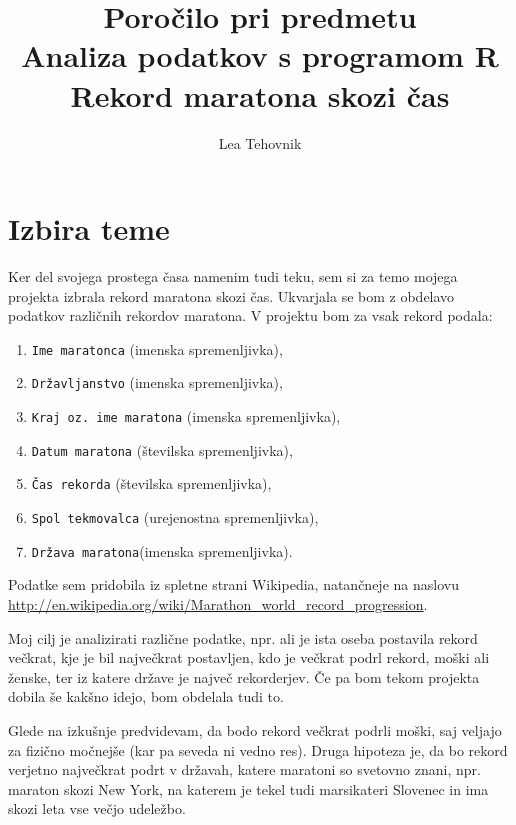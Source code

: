 \documentclass[11pt,a4paper]{article}
\begin{document}
\title{Poročilo pri predmetu \\
Analiza podatkov s programom R\\
\vspace{3mm}
\textbf{{Rekord maratona skozi čas}}}
\author{Lea Tehovnik}
\maketitle


\section{Izbira teme}

Ker del svojega prostega časa namenim tudi teku, sem si za temo mojega projekta izbrala rekord maratona skozi čas.  Ukvarjala se bom z obdelavo podatkov različnih rekordov maratona. V projektu bom za vsak rekord podala:
\begin{enumerate}
\item{\verb|Ime maratonca| (imenska spremenljivka),}
\item{\verb|Državljanstvo| (imenska spremenljivka),}
\item{\verb|Kraj oz. ime maratona| (imenska spremenljivka),}
\item{\verb|Datum maratona| (številska spremenljivka),}
\item{\verb|Čas rekorda| (številska spremenljivka),}
\item{\verb|Spol tekmovalca| (urejenostna spremenljivka),}
\item{\verb|Država maratona|(imenska spremenljivka).}
\end{enumerate}
 

Podatke sem pridobila iz spletne strani Wikipedia, natančneje na naslovu \url{http://en.wikipedia.org/wiki/Marathon_world_record_progression}.

Moj cilj je analizirati različne podatke, npr. ali je ista oseba postavila rekord večkrat, kje je bil največkrat postavljen, kdo je večkrat podrl rekord, moški ali ženske, ter iz katere države je največ rekorderjev. Če pa bom tekom projekta dobila še kakšno idejo, bom obdelala tudi to.

Glede na izkušnje predvidevam, da bodo rekord večkrat podrli moški, saj veljajo za fizično močnejše (kar pa seveda ni vedno res). Druga hipoteza je, da bo rekord verjetno največkrat podrt v državah, katere maratoni so svetovno znani, npr. maraton skozi New York, na katerem je tekel tudi marsikateri Slovenec in ima skozi leta vse večjo udeležbo.
\end{document}
